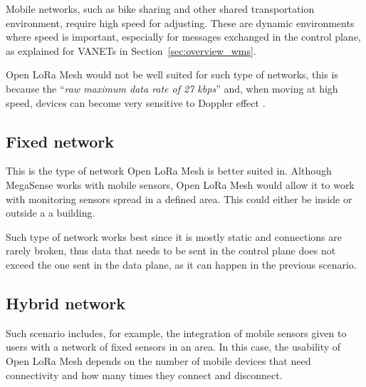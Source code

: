 			Mobile networks, such as bike sharing and other shared transportation environment, require high speed for adjusting. 
			These are dynamic environments where speed is important, especially for messages exchanged in the control plane, as explained for VANETs in Section~\ref{sec:overview_wms}.
			
			Open LoRa Mesh would not be well suited for such type of networks, this is because the ``\textit{raw maximum data rate of 27 kbps}'' \cite{8030482} and, when moving at high speed, devices can become very sensitive to Doppler effect \cite{s21124049}.
		
		\subsection{Fixed network}\label{sec:fixed_network}
		
			This is the type of network Open LoRa Mesh is better suited in.
			Although MegaSense works with mobile sensors, Open LoRa Mesh would allow it to work with monitoring sensors spread in a defined area.
			This could either be inside or outside a a building.
			
			Such type of network works best since it is mostly static and connections are rarely broken, thus data that needs to be sent in the control plane does not exceed the one sent in the data plane, as it can happen in the previous scenario.
		
		\subsection{Hybrid network}
		
			Such scenario includes, for example, the integration of mobile sensors given to users with a network of fixed sensors in an area.
			In this case, the usability of Open LoRa Mesh depends on the number of mobile devices that need connectivity and how many times they connect and disconnect.
			